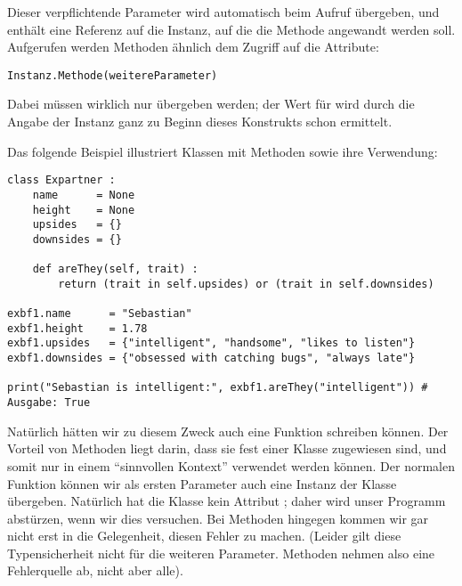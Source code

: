 Dieser verpflichtende Parameter  wird automatisch beim Aufruf übergeben, und enthält eine Referenz auf die Instanz, auf die die Methode angewandt werden soll. Aufgerufen werden Methoden ähnlich dem Zugriff auf die Attribute:
\begin{codebox}
\begin{verbatim}
Instanz.Methode(weitereParameter)
\end{verbatim}
\end{codebox}

Dabei müssen wirklich nur  übergeben werden; der Wert für  wird durch die Angabe der Instanz ganz zu Beginn dieses Konstrukts schon ermittelt.

Das folgende Beispiel illustriert Klassen mit Methoden sowie ihre Verwendung:
\begin{codebox}
\begin{verbatim}
class Expartner :
    name      = None
    height    = None
    upsides   = {}
    downsides = {}
    
    def areThey(self, trait) :
        return (trait in self.upsides) or (trait in self.downsides)

exbf1.name      = "Sebastian"
exbf1.height    = 1.78
exbf1.upsides   = {"intelligent", "handsome", "likes to listen"}
exbf1.downsides = {"obsessed with catching bugs", "always late"}

print("Sebastian is intelligent:", exbf1.areThey("intelligent")) # Ausgabe: True
\end{verbatim}
\end{codebox}

Natürlich hätten wir zu diesem Zweck auch eine Funktion  schreiben können. Der Vorteil von Methoden liegt darin, dass sie fest einer Klasse zugewiesen sind, und somit nur in einem \enquote{sinnvollen Kontext} verwendet werden können. Der normalen Funktion  können wir als ersten Parameter auch eine Instanz der Klasse  übergeben. Natürlich hat die Klasse  kein Attribut ; daher wird unser Programm abstürzen, wenn wir dies versuchen. Bei Methoden hingegen kommen wir gar nicht erst in die Gelegenheit, diesen Fehler zu machen. (Leider gilt diese Typensicherheit nicht für die weiteren Parameter. Methoden nehmen also eine Fehlerquelle ab, nicht aber alle).

